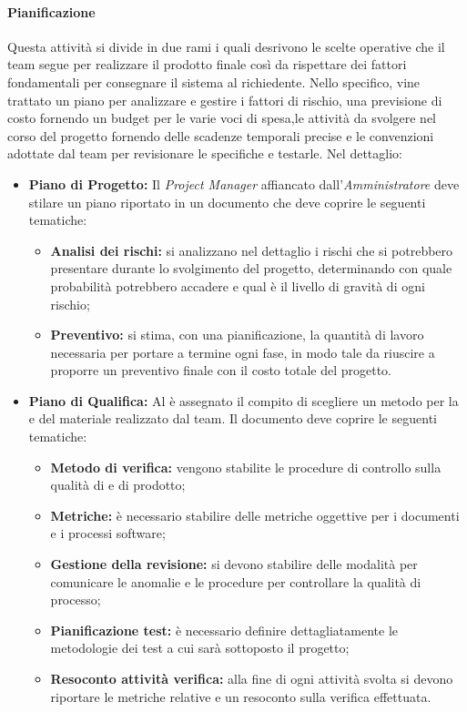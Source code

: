 	   \paragraph{Pianificazione} \Spazio
	   Questa attività si divide in due rami i quali desrivono le scelte operative che il team segue per realizzare il prodotto finale così da rispettare dei fattori fondamentali per consegnare il sistema al richiedente. 
	   Nello specifico, vine trattato un piano per analizzare e gestire i fattori di rischio, una previsione di costo fornendo un budget per le varie voci di spesa,le attività da svolgere nel corso del progetto fornendo delle scadenze temporali precise e le convenzioni adottate dal team per revisionare le specifiche e testarle.
       Nel dettaglio:
       	       
	   \begin{itemize}
		\item \textbf{Piano di Progetto:} \Spazio
		Il \emph{Project Manager} affiancato dall'\emph{Amministratore} deve stilare un piano riportato in un documento che deve coprire le seguenti tematiche:
		\begin{itemize}
		\item \textbf{Analisi dei rischi:} si analizzano nel dettaglio i rischi che si potrebbero presentare durante lo svolgimento del progetto, determinando con quale probabilità potrebbero accadere e qual è il livello di gravità di ogni rischio;
		\item \textbf{Preventivo:} si stima, con una pianificazione, la quantità di lavoro necessaria per portare a termine ogni fase, in modo tale da riuscire a proporre un preventivo finale con il costo totale del progetto.
		\end{itemize}
		
		\item \textbf{Piano di Qualifica:} \Spazio
		Al \emph{} è assegnato il compito di scegliere un metodo per la  e  del materiale realizzato dal team.
		Il documento deve coprire le seguenti tematiche:
		\begin{itemize}
		\item \textbf{Metodo di verifica:} vengono stabilite le procedure di controllo sulla qualità di  e di prodotto;
		\item \textbf{Metriche:} è necessario stabilire delle metriche oggettive per i documenti e i processi software;
		\item \textbf{Gestione della revisione:} si devono stabilire delle modalità per comunicare le anomalie e le procedure per controllare la qualità di processo;
		\item \textbf{Pianificazione test:} è necessario definire dettagliatamente le metodologie dei test a cui sarà sottoposto il progetto;
		\item \textbf{Resoconto attività verifica:} alla fine di ogni attività svolta si devono riportare le metriche relative e un resoconto sulla verifica effettuata.
		\end{itemize}
	\end{itemize}
	
